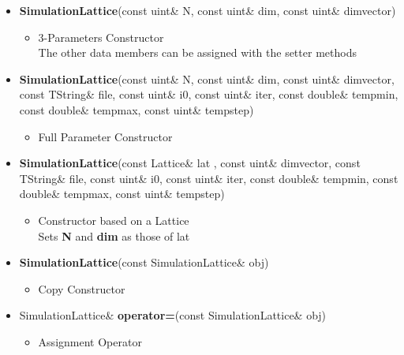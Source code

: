 \begin{itemize}
\begin{itemize}
			\item[] \textbf{SimulationLattice}(const uint\& \textunderscore N, const uint\& \textunderscore dim, const uint\& \textunderscore dim\textunderscore vector)		 
			\begin{itemize}
				\item[] 3-Parameters Constructor \\
						The other data members can be assigned with the setter methods
			\end{itemize}
			
			\item[] \textbf{SimulationLattice}(const uint\& \textunderscore N, const uint\& \textunderscore dim, const uint\& \textunderscore dim\textunderscore vector, const TString\& \textunderscore file, const uint\& \textunderscore i0, const uint\& \textunderscore iter, const double\& \textunderscore tempmin, const double\& \textunderscore tempmax, const uint\& \textunderscore tempstep)		 
			\begin{itemize}
				\item[] Full Parameter Constructor
			\end{itemize}

			\item[] \textbf{SimulationLattice}(const Lattice\& \textunderscore lat , const uint\& \textunderscore dim\textunderscore vector, const TString\& \textunderscore file, const uint\& \textunderscore i0, const uint\& \textunderscore iter, const double\& \textunderscore tempmin, const double\& \textunderscore tempmax, const uint\& \textunderscore tempstep)			 
			\begin{itemize}
				\item[] Constructor based on a Lattice  \\
						Sets \textbf{N} and \textbf{dim} as those of lat    
			\end{itemize}
			
			\item[] \textbf{SimulationLattice}(const SimulationLattice\& obj)		 
			\begin{itemize}
				\item[] Copy Constructor
			\end{itemize}
			
			\item[] SimulationLattice\& \textbf{operator=}(const SimulationLattice\& obj)		 
			\begin{itemize}
				\item[] Assignment Operator \\
			\end{itemize}
		

\end{itemize}
\end{itemize}
